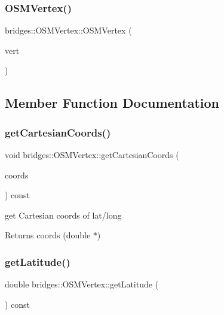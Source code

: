 \subsubsection{\texorpdfstring{OSMVertex()}{OSMVertex()}\hspace{0.1cm}{\footnotesize\ttfamily [3/3]}}
{\footnotesize\ttfamily bridges\+::\+O\+S\+M\+Vertex\+::\+O\+S\+M\+Vertex (\begin{DoxyParamCaption}\item[{const \mbox{\hyperlink{classbridges_1_1_o_s_m_vertex}{O\+S\+M\+Vertex}} $\ast$}]{vert }\end{DoxyParamCaption})\hspace{0.3cm}{\ttfamily [inline]}}



\subsection{Member Function Documentation}
\mbox{\label{classbridges_1_1_o_s_m_vertex_a3c89840e0c5414d38ca177183a6052fa}} 
\subsubsection{\texorpdfstring{getCartesianCoords()}{getCartesianCoords()}}
{\footnotesize\ttfamily void bridges\+::\+O\+S\+M\+Vertex\+::get\+Cartesian\+Coords (\begin{DoxyParamCaption}\item[{double $\ast$}]{coords }\end{DoxyParamCaption}) const\hspace{0.3cm}{\ttfamily [inline]}}

get Cartesian coords of lat/long

\begin{DoxyReturn}{Returns}
coords (double $\ast$) 
\end{DoxyReturn}
\mbox{\label{classbridges_1_1_o_s_m_vertex_aeb44f4c3967d9ed15c606699c830ac2c}} 
\subsubsection{\texorpdfstring{getLatitude()}{getLatitude()}}
{\footnotesize\ttfamily double bridges\+::\+O\+S\+M\+Vertex\+::get\+Latitude (\begin{DoxyParamCaption}{ }\end{DoxyParamCaption}) const\hspace{0.3cm}{\ttfamily [inline]}}

